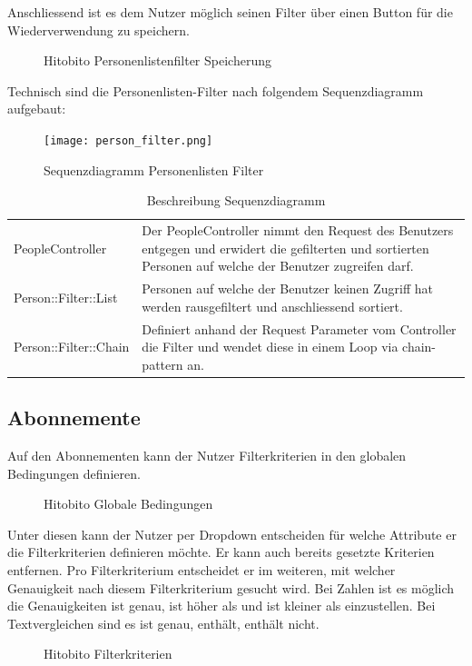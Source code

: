 Anschliessend ist es dem Nutzer möglich seinen Filter über einen Button für die Wiederverwendung
zu speichern.
\begin{figure}[h]
   \centering
   \caption{Hitobito Personenlistenfilter Speicherung}
\end{figure}

\newpage

Technisch sind die Personenlisten-Filter nach folgendem Sequenzdiagramm aufgebaut:
\begin{figure}[h]
   \centering
   \texttt{[image: person\_filter.png]}
   \caption{Sequenzdiagramm Personenlisten Filter}
\end{figure}

\begin{table}[h!]
   \begin{tabular}{|L{0.4\textwidth}|L{0.5\textwidth}|}
       \hline
         \\[12pt]
       \hline
       PeopleController & Der PeopleController nimmt den Request des Benutzers entgegen und erwidert die gefilterten und sortierten Personen auf welche der Benutzer zugreifen darf. \\
       \hline
       Person::Filter::List & Personen auf welche der Benutzer keinen Zugriff hat werden rausgefiltert und anschliessend sortiert. \\
       \hline
       Person::Filter::Chain & Definiert anhand der Request Parameter vom Controller die Filter und wendet diese in einem Loop via chain-pattern an. \\
       \hline
     \end{tabular}
     \caption{Beschreibung Sequenzdiagramm}
\end{table}

\newpage

\subsection{Abonnemente}
Auf den Abonnementen kann der Nutzer Filterkriterien in den globalen Bedingungen definieren.

\begin{figure}[h]
   \centering
   \caption{Hitobito Globale Bedingungen}
\end{figure}

Unter diesen kann der Nutzer per Dropdown entscheiden für welche Attribute er die Filterkriterien definieren möchte.
Er kann auch bereits gesetzte Kriterien entfernen. Pro Filterkriterium entscheidet er im weiteren, mit welcher Genauigkeit
nach diesem Filterkriterium gesucht wird. Bei Zahlen ist es möglich die Genauigkeiten ist genau, ist höher als und ist kleiner als 
einzustellen. Bei Textvergleichen sind es ist genau, enthält, enthält nicht.
\begin{figure}[h]
   \centering
   \caption{Hitobito Filterkriterien}
\end{figure}

